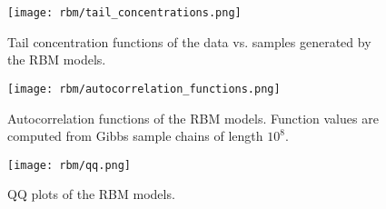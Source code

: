 \begin{figure}[ht]
    \begin{center}
        \texttt{[image: rbm/tail\_concentrations.png]}
    \end{center}
    \caption{Tail concentration functions of the data vs. samples generated by the RBM models.}
    \label{fig:rbm_tail_concentrations}
\end{figure}

\begin{figure}[ht]
    \begin{center}
        \texttt{[image: rbm/autocorrelation\_functions.png]}
    \end{center}
    \caption{Autocorrelation functions of the RBM models. Function values are computed from Gibbs sample chains of length \( 10^8 \).}
    \label{fig:rbm_autocorrelation_functions}
\end{figure}

\begin{figure}[ht]
    \begin{center}
        \texttt{[image: rbm/qq.png]}
    \end{center}
    \caption{QQ plots of the RBM models.}
    \label{fig:rbm_qq_plots}
\end{figure}
